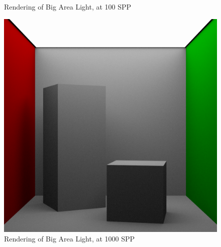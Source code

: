 \documentclass[a4paper]{myarticle}
\begin{document}
\begin{figure}[H]
\begin{minipage}[t]{.3\textwidth}
      \caption{Rendering of Big Area Light, at 100 SPP}
  \end{minipage}
  \hfill
  \begin{minipage}[t]{.3\textwidth}
      \centering
      \includegraphics[width=\textwidth]{q3/big_1_1000.png}
      \caption{Rendering of Big Area Light, at 1000 SPP}
  \end{minipage}
\end{figure}
\end{document}
